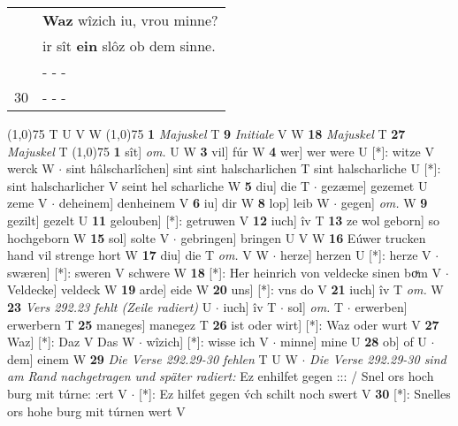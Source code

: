 \documentclass[8pt,a4paper,notitlepage]{article}
\begin{document}
\begin{table}[ht]
\begin{minipage}[t]{0.5\linewidth}
\begin{tabular}{rl}
 & \textbf{Waz} wîzich iu, vrou minne?\\ 
 & ir sît \textbf{ein} slôz ob dem sinne.\\ 
 & \multicolumn{1}{l}{ - - - }\\ 
30 & \multicolumn{1}{l}{ - - - }\\ 
\end{tabular}
\scriptsize
\line(1,0){75} \newline
T U V W \newline
\line(1,0){75} \newline
\textbf{1} \textit{Majuskel} T  \textbf{9} \textit{Initiale} V W  \textbf{18} \textit{Majuskel} T  \textbf{27} \textit{Majuskel} T  \newline
\line(1,0){75} \newline
\textbf{1} sît] \textit{om.} U W \textbf{3} vil] fúr W \textbf{4} wer] wer were U [*]: witze V werck W  $\cdot$ sint hâlscharlîchen] sint sint halscharlichen T sint halscharliche U [*]: sint halscharlicher V seint hel scharliche W \textbf{5} diu] die T  $\cdot$ gezæme] gezemet U zeme V  $\cdot$ deheinem] denheinem V \textbf{6} iu] dir W \textbf{8} lop] leib W  $\cdot$ gegen] \textit{om.} W \textbf{9} gezilt] gezelt U \textbf{11} gelouben] [*]: getruwen V \textbf{12} iuch] îv T \textbf{13} ze wol geborn] so hochgeborn W \textbf{15} sol] solte V  $\cdot$ gebringen] bringen U V W \textbf{16} Eúwer trucken hand vil strenge hort W \textbf{17} diu] die T \textit{om.} V W  $\cdot$ herze] herzen U [*]: herze V  $\cdot$ swæren] [*]: sweren V schwere W \textbf{18} [*]: Her heinrich von veldecke sinen boͮm V  $\cdot$ Veldecke] veldeck W \textbf{19} arde] eide W \textbf{20} uns] [*]: vns do V \textbf{21} iuch] îv T \textit{om.} W \textbf{23} \textit{Vers 292.23 fehlt (Zeile radiert)} U   $\cdot$ iuch] îv T  $\cdot$ sol] \textit{om.} T  $\cdot$ erwerben] erwerbern T \textbf{25} maneges] manegez T \textbf{26} ist oder wirt] [*]: Waz oder wurt V \textbf{27} Waz] [*]: Daz V Das W  $\cdot$ wîzich] [*]: wisse ich V  $\cdot$ minne] mine U \textbf{28} ob] of U  $\cdot$ dem] einem W \textbf{29} \textit{Die Verse 292.29-30 fehlen} T U W   $\cdot$ \textit{Die Verse 292.29-30 sind am Rand nachgetragen und später radiert:} Ez enhilfet gegen ::: / Snel ors hoch burg mit túrne: :ert V   $\cdot$ [*]: Ez hilfet gegen v́ch schilt noch swert V \textbf{30} [*]: Snelles ors hohe burg mit túrnen wert V \newline
\end{minipage}
\end{table}
\end{document}
